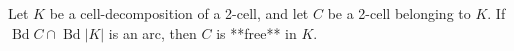 Let $K$ be a cell-decomposition of a 2-cell, and let $C$ be a 2-cell belonging to $K$. If $\operatorname{Bd} C \cap \operatorname{Bd} |K|$ is an arc, then $C$ is **free** in $K$.
